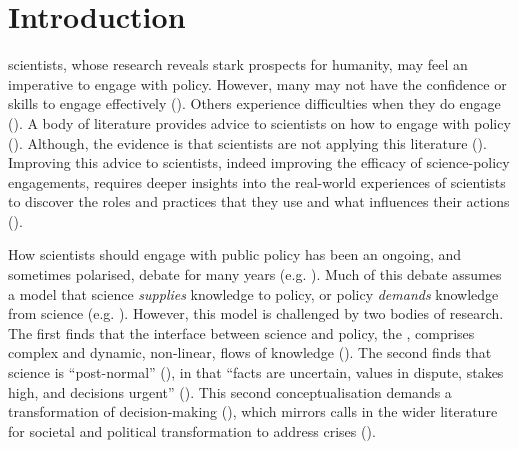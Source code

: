 \chapter{Introduction}\label{ch:intro}

\CAN{} scientists, whose research reveals stark prospects for humanity, may feel an imperative to engage with policy. However, many may not have the confidence or skills to engage effectively (\cite{BednarekSHG2015,KennyRHTB2017,KEU2021perceptions}). Others experience difficulties when they do engage (\cite{Stirling2010,Gerber2023,Hicks2024}). A body of literature provides advice to scientists on how to engage with policy (\cite{OliverC2019}). Although, the evidence is that scientists are not applying this literature (\cite{CairneyTS2023}). Improving this advice to scientists, indeed improving the efficacy of science-policy engagements, requires deeper insights into the real-world experiences of scientists to discover the roles and practices that they use and what influences their actions  (\cite{KennyRHTB2017}). 

How scientists should engage with public policy has been an ongoing, and sometimes polarised, debate for many years (e.g. \cite{Lackey2004,Nau2009,Stirling2010,Milman2013,Tyler2013,Oreskes2020,GluckmanBK2021,GregoryBW2024,Bisbal2024,Hicks2024}). Much of this debate assumes a model that science \emph{supplies} knowledge to policy, or policy \emph{demands} knowledge from science (e.g. \cite{McNie2007,KennyRHTB2017,Castree2019}). However, this model is challenged by two bodies of research. The first finds that the interface between science and policy, the \SPI, comprises complex and dynamic, non-linear, flows of knowledge (\cite{StrassheimK2014,BoswellS2017}). The second finds that \CAN{} science is ``post-normal'' (\cite{FuntowiczR1993}), in that ``facts are uncertain, values in dispute, stakes high, and decisions urgent'' (\cite[p649]{Ravetz1999}). This second conceptualisation demands a transformation of \CAN{} decision-making (\cite{FuntowiczR1993,Ravetz1999,Jasanoff2003,Hewitt2024}), which mirrors calls in the wider literature for societal and political transformation to address \CAN{} crises (\cite{DiazEtAl2019,LaybournTS2023,VerfuerthDCWP2023,GuptaEtAl2024}).

